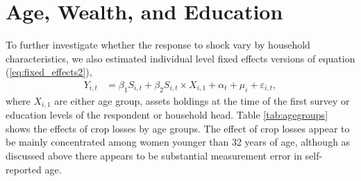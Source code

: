 \documentclass[letterpaper,12pt]{article}
\begin{document}



% 




































\clearpage
\section{Age, Wealth, and Education}

To further investigate whether the response to shock vary by household
characteristics, we also estimated individual level fixed effects versions 
of equation (\ref{eq:fixed_effects2}),
\begin{align}
Y_{i,t} &=  \beta_1 S_{i,t}  +  \beta_2 S_{i,t} \times X_{i,1} +
\alpha_{t} + \mu_i + \varepsilon_{i,t},   
\label{eq:fixed_effects2} 
\end{align}
where $X_{i,1}$ are either age group, assets holdings at the time of 
the first survey or education levels of the respondent or household head.
Table \ref{tab:agegroups} shows the effects of crop losses by age groups.
The effect of crop losses appear to be mainly concentrated among women 
younger than 32 years of age, although as discussed above there appears 
to be substantial measurement error in self-reported age.
\end{document}
